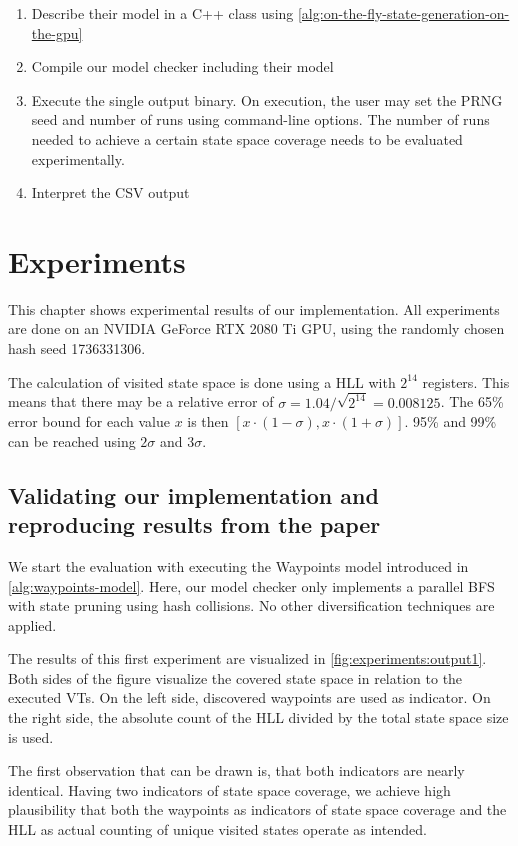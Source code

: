 \documentclass[
fancyheadings, %
%
%
]{stsreprt}
\begin{document}
\begin{enumerate}
    \item Describe their model in a C++ class using \cref{alg:on-the-fly-state-generation-on-the-gpu}
    \item Compile our model checker including their model
    \item Execute the single output binary.
          On execution, the user may set the PRNG seed and number of runs using command-line options.
          The number of runs needed to achieve a certain state space coverage needs to be evaluated experimentally.
    \item Interpret the CSV output
\end{enumerate}

\chapter{Experiments}

This chapter shows experimental results of our implementation.
All experiments are done on an NVIDIA GeForce RTX 2080 Ti GPU, using the randomly chosen hash seed 1736331306.

The calculation of visited state space is done using a HLL with $2^{14}$ registers.
This means that there may be a relative error of $\sigma=1.04 / \sqrt{2^{14}}=\num{0.008125}$.
The 65\% error bound for each value $x$ is then $\left[x \cdot (1-\sigma), x \cdot (1+\sigma)\right]$.
95\% and 99\% can be reached using $2\sigma$ and $3\sigma$.

\section{Validating our implementation and reproducing results from the paper}

We start the evaluation with executing the Waypoints model introduced in \cref{alg:waypoints-model}.
Here, our model checker only implements a parallel BFS with state pruning using hash collisions.
No other diversification techniques are applied.

The results of this first experiment are visualized in \cref{fig:experiments:output1}.
Both sides of the figure visualize the covered state space in relation to the executed VTs.
On the left side, discovered waypoints are used as indicator.
On the right side, the absolute count of the HLL divided by the total state space size is used.

The first observation that can be drawn is, that both indicators are nearly identical.
Having two indicators of state space coverage, we achieve high plausibility that both the waypoints as indicators of state space coverage and the HLL as actual counting of unique visited states operate as intended.
\end{document}
